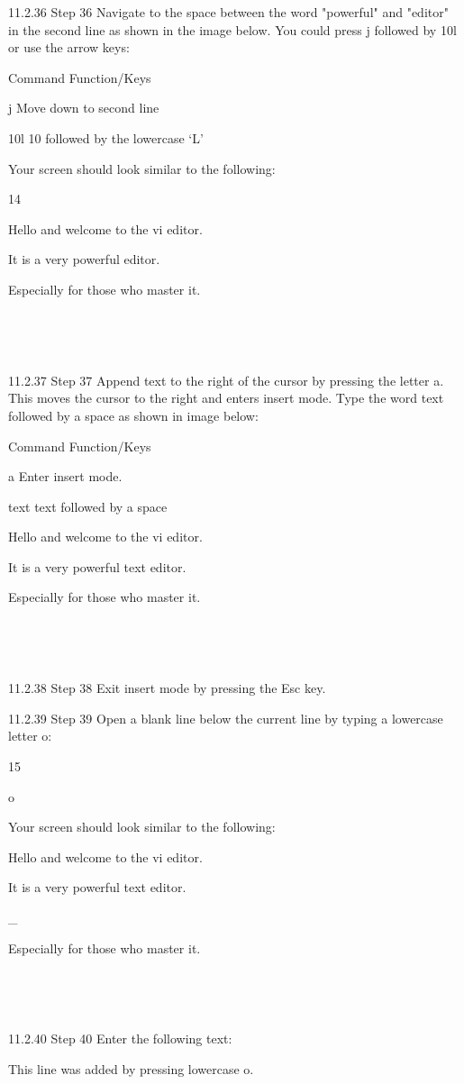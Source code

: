 11.2.36 Step 36
Navigate to the space between the word "powerful" and "editor" in the second line as shown
in the image below. You could press j followed by 10l or use the arrow keys:

Command Function/Keys

j Move down to second line

10l 10 followed by the lowercase ‘L’

Your screen should look similar to the following:

14



Hello and welcome to the vi editor.

It is a very powerful editor.

Especially for those who master it.

~

~

11.2.37 Step 37
Append text to the right of the cursor by pressing the letter a. This moves the cursor to the right
and enters insert mode. Type the word text followed by a space as shown in image below:

Command Function/Keys

a Enter insert mode.

text text followed by a space

Hello and welcome to the vi editor.

It is a very powerful text editor.

Especially for those who master it.

~

~

11.2.38 Step 38
Exit insert mode by pressing the Esc key.

11.2.39 Step 39
Open a blank line below the current line by typing a lowercase letter o:

15



o

Your screen should look similar to the following:

Hello and welcome to the vi editor.

It is a very powerful text editor.

_

Especially for those who master it.

~

~

11.2.40 Step 40
Enter the following text:

This line was added by pressing lowercase o.

